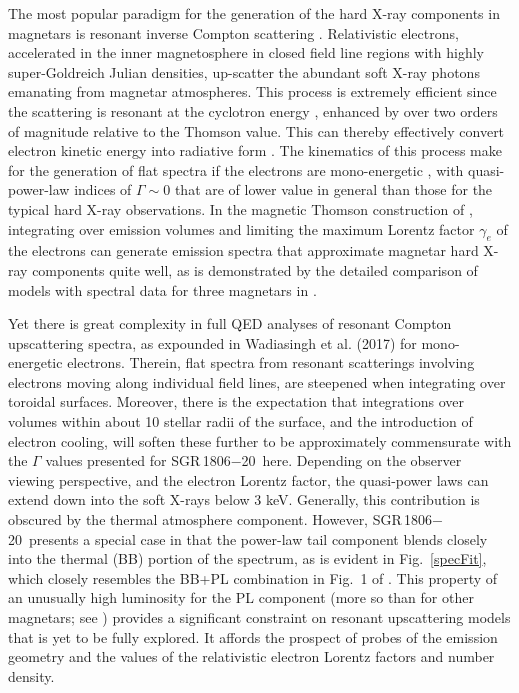 \documentclass[twocolumn]{aastex6}
\def \src {SGR\,1806$-$20}
\begin{document}
The most popular paradigm for the generation of the hard X-ray
components in magnetars is resonant inverse Compton scattering
\citep{baring07,fernandez07ApJ}. Relativistic electrons, accelerated
in the inner magnetosphere in closed field line regions with highly
super-Goldreich Julian densities, up-scatter the abundant soft X-ray
photons emanating from magnetar atmospheres. This process is extremely
efficient since the scattering is resonant at the cyclotron energy
\citep[e.g.,][]{herold79:qed}, enhanced by over two orders of
magnitude relative to the Thomson value.  This can thereby effectively
convert electron kinetic energy into radiative form
\citep{baring11ApJ}. The kinematics of this process make for the
generation of flat spectra if the electrons are mono-energetic
\citep{baring07}, with quasi-power-law indices of $\Gamma \sim 0$ that
are of lower value in general than those for the typical hard X-ray observations. 
In the magnetic Thomson construction of \citet{beloborodov13ApJ},
integrating over emission volumes and limiting the maximum Lorentz
factor $\gamma_e$ of the electrons can generate emission spectra that
approximate magnetar hard X-ray components quite well, as is
demonstrated by the detailed comparison of models with spectral data
for three magnetars in \cite[][see also,
\citealt{an13ApJ:1841,vogel14ApJ:2259,an15ApJ:1841}]{hascoet14ApJ}.

Yet there is great complexity in full QED analyses of resonant Compton
upscattering spectra, as expounded in Wadiasingh et al. (2017) for
mono-energetic electrons. Therein, flat spectra from resonant scatterings
involving electrons moving along individual field lines, are steepened
when integrating over toroidal surfaces. Moreover, there is the
expectation that integrations over volumes within about 10 stellar
radii of the surface, and the introduction of electron cooling, will
soften these further to be approximately commensurate with the
$\Gamma$ values presented for \src\ here. Depending on the
observer viewing perspective, and the electron Lorentz factor, the
quasi-power laws can extend down into the soft X-rays below 3 keV.
Generally, this contribution is obscured by the thermal atmosphere component.
However, \src\ presents a special case in that the power-law tail
component blends closely into the thermal (BB) portion of the
spectrum, as is evident in Fig.~\ref{specFit}, which closely resembles
the BB+PL combination in Fig.~1 of \citet{enoto10ApJ}. This property
of an unusually high luminosity for the PL component (more so than for
other magnetars; see \citealt{gotz06AA:1900,enoto10ApJ}) provides a
significant constraint on resonant upscattering models that is yet to
be fully explored. It affords the prospect of probes of the emission
geometry and the values of the relativistic electron Lorentz factors
and number density.
\end{document}
